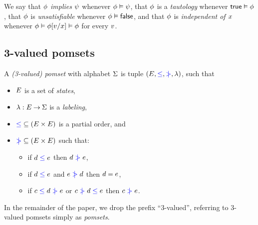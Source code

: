 We say that $\phi$ \emph{implies} $\psi$ whenever $\phi\vDash\psi$,
that $\phi$ is a \emph{tautology} whenever $\mathsf{true}\vDash\phi$, that
$\phi$ is \emph{unsatisfiable} whenever $\phi\vDash\mathsf{false}$, and that
$\phi$ is \emph{independent of $x$} whenever
$\phi \vDash \phi[v/x] \vDash \phi$ for every $v$.


\subsection{3-valued pomsets}
\label{sec:pomsets}

\begin{definition}
  A \emph{(3-valued) pomset} with alphabet $\Sigma$ is tuple $(E,
  {\mathrel{{\color{blue}\leq}}}, {\mathrel{{\color{blue}\mkern4mu\mid\!\!\!>}}}, \lambda)$, such that 
  \begin{itemize}
  \item $E$ is a set of \emph{states},
  \item $\lambda: E \mathbin\rightarrow \Sigma$ is a \emph{labeling},
  \item ${\mathrel{{\color{blue}\leq}}} \subseteq (E\times E)$ is a partial order, and
  \item ${\mathrel{{\color{blue}\mkern4mu\mid\!\!\!>}}} \subseteq (E\times E)$ such that:
    \begin{itemize}
    \item\label{5a} if $d \mathrel{{\color{blue}\leq}} e$ then $d \mathrel{{\color{blue}\mkern4mu\mid\!\!\!>}} e$,
    \item\label{5b} if $d \mathrel{{\color{blue}\leq}} e$ and $e \mathrel{{\color{blue}\mkern4mu\mid\!\!\!>}} d$ then $d = e$,
    \item if $c \mathrel{{\color{blue}\leq}} d \mathrel{{\color{blue}\mkern4mu\mid\!\!\!>}} e$ or $c \mathrel{{\color{blue}\mkern4mu\mid\!\!\!>}} d \mathrel{{\color{blue}\leq}} e$ then $c \mathrel{{\color{blue}\mkern4mu\mid\!\!\!>}} e$.
    \end{itemize}
\end{itemize}
\end{definition}
In the remainder of the paper, we drop the prefix ``3-valued'', referring to
3-valued pomsets simply as \emph{pomsets}.

